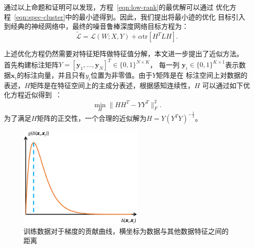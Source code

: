 \documentclass[doctor]{ustcthesis}
\def \x {\mathbf{x}}
\def \y {\mathbf{y}}
\def \L {\mathcal{L}}
\begin{document}
通过以上命题和证明可以发现，方程~\eqref{eqn:low-rank}的最优解可以通过
优化方程~\eqref{eqn:spec-cluster}中的最小迹得到。因此，我们提出将最小迹的优化
目标引入到经典的神经网络中，最终的噪音鲁棒深度网络目标方程为：
\begin{equation}\label{eqn:rf-cnn-obj}
    \widetilde{\L} = \L(W;X,Y) + \alpha \text{tr}[H^TLH].
\end{equation}

上述优化方程仍然需要对特征矩阵做特征值分解，本文进一步提出了近似方法。
首先构建标注矩阵$Y = [\y_1,\ldots, \y_N]^T \in \{0,1\}^{N\times K}$， 每一列
$\y_i\in\{0,1\}^{K\times
1}$表示数据$\x_i$的标注向量，并且只有$y_i$位置为非零值。由于$Y$矩阵是在
标注空间上对数据的表述，$H$矩阵是在特征空间上的主成分表述，根据感知连续性，$H$
可以通过如下优化方程近似得到~\cite{yang2011l2,ye2008discriminative}：
\begin{equation}
    \min_{H} \|HH^T - YY^T\|_F^2.
\end{equation}
为了满足$H$矩阵的正交性，一个合理的近似解为$H = Y(Y^TY)^{-\frac{1}{2}}$。

\begin{figure}[t]
    \center
    \includegraphics[clip=true, width=0.55\textwidth]{rf-cnn-gradient}
    \caption{训练数据对于梯度的贡献曲线，横坐标为数据与其他数据特征之间的距离}\label{fig:rf-cnn-gradient}
\end{figure}
\end{document}

